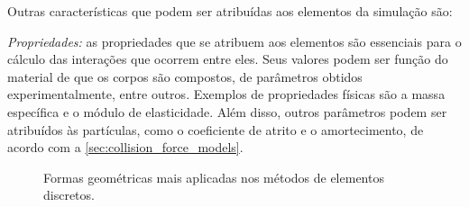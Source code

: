 Outras características que podem ser atribuídas aos elementos da simulação são:
\begin{alineas}
\item \textit{Propriedades:} as propriedades que se atribuem aos elementos são essenciais para o cálculo das interações que ocorrem entre eles. Seus valores podem ser função do material de que os corpos são compostos, de parâmetros obtidos experimentalmente, entre outros. Exemplos de propriedades físicas são a massa específica e o módulo de elasticidade. Além disso, outros parâmetros podem ser atribuídos às partículas, como o coeficiente de atrito e o amortecimento, de acordo com a \cref{sec:collision_force_models}.

\begin{figure}[h]
	\caption{Formas geométricas mais aplicadas nos métodos de elementos discretos.}
	\centering
	\captionsetup[subfloat]{labelfont=bf}
	\label{fig:element_geometry}
	\sourceMe
\end{figure}


\end{alineas}
